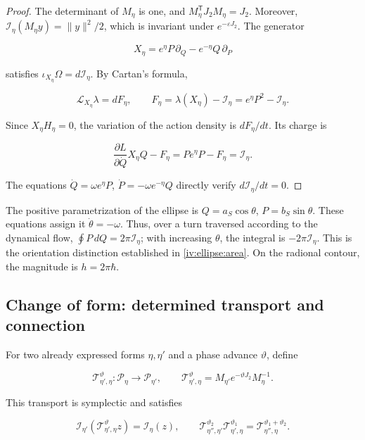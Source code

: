 \begin{proof}
The determinant of \(M_\eta\) is one, and \(M_\eta^{\mathsf T}J_2M_\eta=J_2\). Moreover, \(\mathcal I_\eta(M_\eta y)=\|y\|^2/2\), which is invariant under \(e^{-\varepsilon J_2}\).
The generator

\[
X_\eta=e^\eta P\,\partial_Q-e^{-\eta}Q\,\partial_P
\]

satisfies \(\iota_{X_\eta}\Omega=d\mathcal I_\eta\). By Cartan's formula,

\[
\mathcal L_{X_\eta}\lambda=dF_\eta,\qquad
F_\eta=\lambda(X_\eta)-\mathcal I_\eta=e^\eta P^2-\mathcal I_\eta.
\]

Since \(X_\eta H_\eta=0\), the variation of the action density is \(dF_\eta/dt\). Its charge is

\[
\frac{\partial L}{\partial\dot Q}X_\eta Q-F_\eta
=Pe^\eta P-F_\eta=\mathcal I_\eta.
\]

The equations \(\dot Q=\omega e^\eta P\), \(\dot P=-\omega e^{-\eta}Q\) directly verify \(d\mathcal I_\eta/dt=0\).
\end{proof}

The positive parametrization of the ellipse is \(Q=a_S\cos\theta\), \(P=b_S\sin\theta\). These equations assign it \(\dot\theta=-\omega\). Thus, over a turn traversed according to the dynamical flow, \(\oint P\,dQ=2\pi\mathcal I_\eta\); with increasing \(\theta\), the integral is \(-2\pi\mathcal I_\eta\). This is the orientation distinction established in \cref{iv:ellipse:area}. On the radional contour, the magnitude is \(h=2\pi\hbar\).

\subsection{Change of form: determined transport and connection}

For two already expressed forms \(\eta,\eta'\) and a phase advance \(\vartheta\), define

\begin{equation}
\mathcal T_{\eta',\eta}^{\vartheta}:\mathcal P_\eta\to\mathcal P_{\eta'},
\qquad
\mathcal T_{\eta',\eta}^{\vartheta}
=M_{\eta'}e^{-\vartheta J_2}M_\eta^{-1}.
\label{nuc07:eq:4}
\end{equation}

\begin{proposition}
This transport is symplectic and satisfies

\begin{equation}
\mathcal I_{\eta'}(\mathcal T_{\eta',\eta}^{\vartheta}z)
=\mathcal I_\eta(z),\qquad
\mathcal T_{\eta'',\eta'}^{\vartheta_2}
\mathcal T_{\eta',\eta}^{\vartheta_1}
=\mathcal T_{\eta'',\eta}^{\vartheta_1+\vartheta_2}.
\label{nuc07:eq:5}
\end{equation}
\end{proposition}


